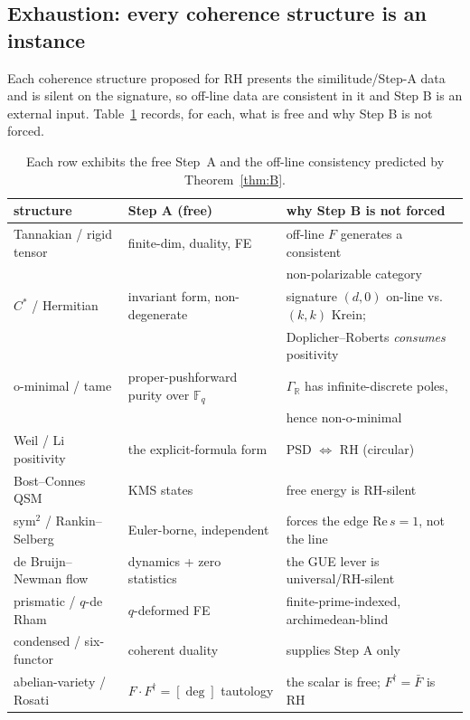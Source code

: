 \documentclass[11pt,reqno]{amsart}
\theoremstyle{plain}
\theoremstyle{definition}
\theoremstyle{remark}
\newcommand{\R}{\mathbb{R}}
\newcommand{\F}{\mathbb{F}}
\newcommand{\dg}{^{\dagger}}
\begin{document}
\subsection{Exhaustion: every coherence structure is an instance}\label{sec:exhaustion}
Each coherence structure proposed for RH presents the similitude/Step-A data and is silent on the signature,
so off-line data are consistent in it and Step B is an external input. Table~\ref{tab:exhaustion} records, for
each, what is free and why Step B is not forced.

\begin{table}[h]
\small
\begin{tabular}{@{}lll@{}}
\toprule
structure & Step A (free) & why Step B is not forced \\
\midrule
Tannakian / rigid tensor & finite-dim, duality, FE & off-line $F$ generates a consistent \\
 & & non-polarizable category \cite{DeligneMilne} \\
$C^*$ / Hermitian & invariant form, non-degenerate & signature $(d,0)$ on-line vs.\ $(k,k)$ Krein; \\
 & & Doplicher--Roberts \emph{consumes} positivity \cite{DR} \\
o-minimal / tame & proper-pushforward purity over $\F_q$ & $\Gamma_\R$ has infinite-discrete poles, \\
 & & hence non-o-minimal \cite{BBT,vdD} \\
Weil / Li positivity & the explicit-formula form & PSD $\Leftrightarrow$ RH (circular) \cite{Bombieri} \\
Bost--Connes QSM & KMS states & free energy is RH-silent \cite{BostConnes} \\
sym$^2$ / Rankin--Selberg & Euler-borne, independent & forces the edge $\mathrm{Re}\,s=1$, not the line \\
de Bruijn--Newman flow & dynamics + zero statistics & the GUE lever is universal/RH-silent \\
prismatic / $q$-de Rham & $q$-deformed FE & finite-prime-indexed, archimedean-blind \\
condensed / six-functor & coherent duality & supplies Step A only \\
abelian-variety / Rosati & $F\cdot F\dg=[\deg]$ tautology & the scalar is free; $F\dg=\bar F$ is RH \\
\bottomrule
\end{tabular}
\medskip
\caption{Each row exhibits the free Step~A and the off-line consistency predicted by Theorem~\ref{thm:B}.}
\label{tab:exhaustion}
\end{table}
\end{document}
